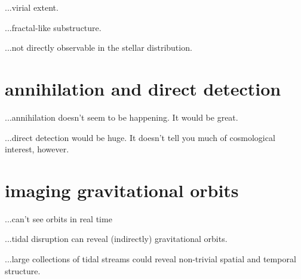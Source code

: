 \documentclass[12pt]{article}
\begin{document}
...virial extent.

...fractal-like substructure.

...not directly observable in the stellar distribution.

\section{annihilation and direct detection}

...annihilation doesn't seem to be happening.  It would be great.

...direct detection would be huge.  It doesn't tell you much of
cosmological interest, however.

\section{imaging gravitational orbits}

...can't see orbits in real time

...tidal disruption can reveal (indirectly) gravitational orbits.

...large collections of tidal streams could reveal non-trivial spatial
and temporal structure.
\end{document}
